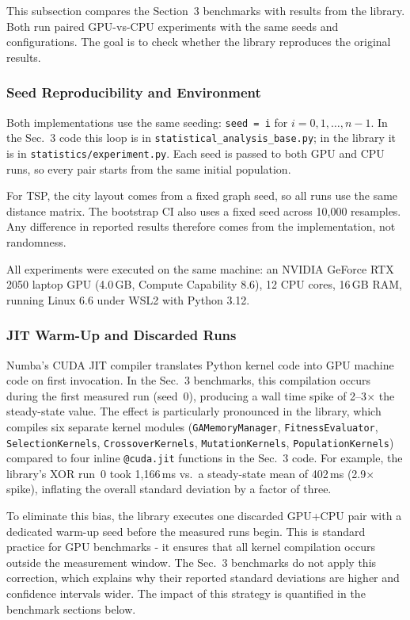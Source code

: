 \documentclass[a4paper,14pt]{extarticle}
\begin{document}
This subsection compares the Section~3 benchmarks with results from the library. Both run paired GPU-vs-CPU experiments with the same seeds and configurations. The goal is to check whether the library reproduces the original results.

\subsubsection*{Seed Reproducibility and Environment} Both implementations use the same seeding: \texttt{seed = i} for $i = 0, 1, \dots, n{-}1$. In the Sec.~3 code this loop is in \texttt{statistical\_analysis\_base.py}; in the library it is in \texttt{statistics/experiment.py}. Each seed is passed to both GPU and CPU runs, so every pair starts from the same initial population.

For TSP, the city layout comes from a fixed graph seed, so all runs use the same distance matrix. The bootstrap CI also uses a fixed seed across 10{,}000 resamples. Any difference in reported results therefore comes from the implementation, not randomness.

All experiments were executed on the same machine: an NVIDIA GeForce RTX 2050 laptop GPU (4.0\,GB, Compute Capability 8.6), 12 CPU cores, 16\,GB RAM, running Linux 6.6 under WSL2 with Python 3.12.

\subsubsection*{JIT Warm-Up and Discarded Runs}

Numba's CUDA JIT compiler translates Python kernel code into GPU machine code on first invocation. In the Sec.~3 benchmarks, this compilation occurs during the first measured run (seed~0), producing a wall time spike of 2--3$\times$ the steady-state value. The effect is particularly pronounced in the library, which compiles six separate kernel modules (\texttt{GAMemory\-Manager}, \texttt{Fitness\-Evaluator}, \texttt{Selection\-Kernels}, \texttt{Crossover\-Kernels}, \texttt{Mutation\-Kernels}, \texttt{Population\-Kernels}) compared to four inline \texttt{@cuda.jit} functions in the Sec.~3 code. For example, the library's XOR run~0 took 1{,}166\,ms vs.\ a steady-state mean of 402\,ms (2.9$\times$ spike), inflating the overall standard deviation by a factor of three.

To eliminate this bias, the library executes one discarded GPU+CPU pair with a dedicated warm-up seed before the measured runs begin. This is standard practice for GPU benchmarks - it ensures that all kernel compilation occurs outside the measurement window. The Sec.~3 benchmarks do not apply this correction, which explains why their reported standard deviations are higher and confidence intervals wider. The impact of this strategy is quantified in the benchmark sections below.
\end{document}
